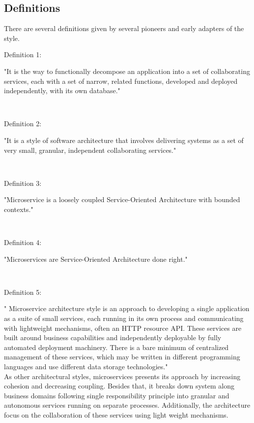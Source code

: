 \subsection{Definitions}\label{section:context/microservices_architecture_style/definitions}
There are several definitions given by several pioneers and early adapters of the style.
\\
\begin{shaded}Definition 1: \cite{Richardson:2014ac} \end{shaded}
"It is the way to functionally decompose an application into a set of collaborating services, each with a set of narrow, related functions, developed and deployed independently, with its own database."

\\
\begin{shaded}Definition 2: \cite{Wootton:2014aa}\end{shaded}
"It is a style of software architecture that involves delivering systems as a set of very small, granular, independent collaborating services."


\\
\begin{shaded}Definition 3: \cite{Cockcroft:2015aa}\end{shaded}
"Microservice is a loosely coupled Service-Oriented Architecture with bounded contexts."


\\
\begin{shaded}Definition 4: \cite{Fowler:2014aa}\cite{Radchenko:2015aa}\end{shaded}
"Microservices are Service-Oriented Architecture done right."


\\
\begin{shaded}Definition 5: \cite{Fowler:2014aa}\end{shaded}
" Microservice architecture style is an approach to developing a single application as a suite of small services, each running in its own process and communicating with lightweight mechanisms, often an HTTP resource API. These services are built around business capabilities and independently deployable by fully automated deployment machinery. There is a bare minimum of centralized management of these services, which may be written in different programming languages and use different data storage technologies."
\\
As other architectural styles, microservices presents its approach by increasing cohesion and decreasing coupling. Besides that, it breaks down system along business domains following single responsibility principle into granular and autonomous services running on separate processes. Additionally, the architecture focus on the collaboration of these services using light weight mechanisms.

